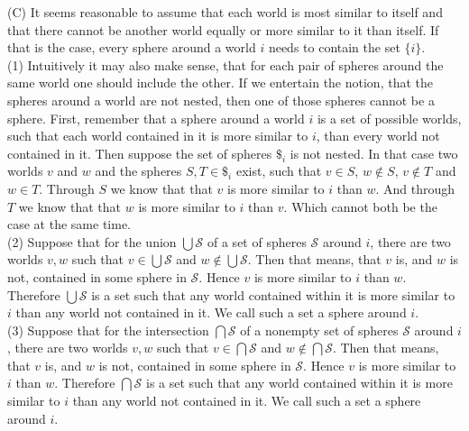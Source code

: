 \documentclass[a4paper,american,10pt]{paper}
\theoremstyle{definition}\newtheorem{definition}{Definition}
\begin{document}
(C) It seems reasonable to assume that each world is most similar to itself and that there cannot be another world equally or more similar to it than itself. If that is the case, every sphere around a world $i$ needs to contain the set $\{ i\}$.\\
\indent (1) Intuitively it may also make sense, that for each pair of spheres around the same world one should include the other. If we entertain the notion, that the spheres around a world are not nested, then one of those spheres cannot be a sphere. First, remember that a sphere around a world $i$ is a set of possible worlds, such that each world contained in it is more similar to $i$, than every world not contained in it. Then suppose the set of spheres $\$_i$ is not nested. In that case two worlds $v$ and $w$ and the spheres $S,T\in\$_i$ exist, such that $v\in S$, $w\notin S$, $v\notin T$ and $w\in T$. Through $S$ we know that that $v$ is more similar to $i$ than $w$. And through $T$ we know that that $w$ is more similar to $i$ than $v$. Which cannot both be the case at the same time.\\
\indent (2) Suppose that for the union $\bigcup\mathscr{S}$ of a set of spheres $\mathscr{S}$ around $i$, there are two worlds $v,w$ such that $v\in\bigcup\mathscr{S}$ and $w\notin\bigcup\mathscr{S}$. Then that means, that $v$ is, and $w$ is not, contained in some sphere in $\mathscr{S}$. Hence $v$ is more similar to $i$ than $w$. Therefore $\bigcup\mathscr{S}$ is a set such that any world contained within it is more similar to $i$ than any world not contained in it. We call such a set a sphere around $i$.\\
\indent (3) Suppose that for the intersection $\bigcap\mathscr{S}$ of a nonempty set of spheres $\mathscr{S}$ around $i$, there are two worlds $v,w$ such that $v\in\bigcap\mathscr{S}$ and $w\notin\bigcap\mathscr{S}$. Then that means, that $v$ is, and $w$ is not, contained in some sphere in $\mathscr{S}$. Hence $v$ is more similar to $i$ than $w$. Therefore $\bigcap\mathscr{S}$ is a set such that any world contained within it is more similar to $i$ than any world not contained in it. We call such a set a sphere around $i$.
\end{document}
